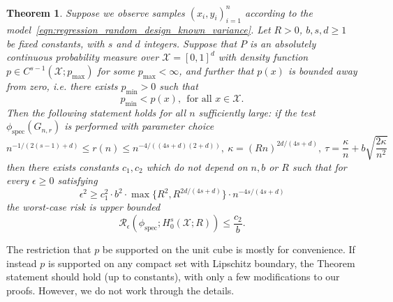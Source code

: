 \documentclass{article}
\newcommand{\1}{\mathbf{1}}
\newcommand{\Xset}{\mathcal{X}}
\newcommand{\spec}{\mathrm{spec}}
\theoremstyle{alden}
\theoremstyle{aldenthm}
\newtheorem{theorem}{Theorem}
\theoremstyle{definition}
\theoremstyle{remark}
\begin{document}
\begin{theorem}
	\label{thm:sobolev_testing_rate}
	Suppose we observe samples $(x_i,y_i)_{i = 1}^{n}$ according to the model~\eqref{eqn:regression_random_design_known_variance}. Let $R > 0$, $b,s,d \geq 1$ be fixed constants, with $s$ and $d$ integers. Suppose that $P$ is an absolutely continuous probability measure over $\mathcal{X} = [0,1]^d$ with density function $p \in C^{s-1}(\Xset;p_{\max})$ for some $p_{\max} < \infty$, and further that $p(x)$ is bounded away from zero, i.e. there exists $p_{\min} > 0$ such that 
	\begin{equation*}
	p_{\min} < p(x),~~ \textrm{for all $x \in \mathcal{X}$.}
	\end{equation*}
	Then the following statement holds for all $n$ sufficiently large: if the test $\phi_{\spec}(G_{n,r})$ is performed with parameter choice
	\begin{equation*}
	n^{-1/(2(s-1) + d)} \leq r(n) \leq n^{-4/((4s + d)(2+d))}, ~\kappa = (Rn)^{2d/(4s + d)}, ~\tau = \frac{\kappa}{n} + b\sqrt{\frac{2\kappa}{n^2}}
	\end{equation*}
	then there exists constants $c_1,c_2$ which do not depend on $n,b$ or $R$ such that for every $\epsilon \geq 0$ satisfying
	\begin{equation}
	\label{eqn:sobolev_testing_rate}
	\epsilon^2 \geq c_1^2 \cdot b^2 \cdot \max\{R^2,R^{2d/(4s + d)}\} \cdot n^{-{4s}/(4s + d)}
	\end{equation}
	the worst-case risk is upper bounded
	\begin{equation}
	\label{eqn:sobolev_testing_rate_1}
	\mathcal{R}_{\epsilon}(\phi_{\mathrm{spec}}; H_0^{s}(\mathcal{X};R)) \leq \frac{c_2}{b}.
	\end{equation}
\end{theorem}

The restriction that $p$ be supported on the unit cube is mostly for convenience. If instead $p$ is supported on any compact set with Lipschitz boundary, the Theorem statement should hold (up to constants), with only a few modifications to our proofs. However, we do not work through the details.
\end{document}
